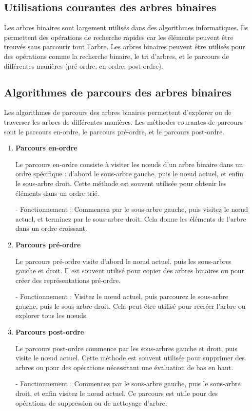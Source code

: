 \subsection{Utilisations courantes des arbres binaires}
Les arbres binaires sont largement utilisés dans des algorithmes informatiques. Ils permettent des opérations de recherche rapides car les éléments peuvent être trouvés sans parcourir tout l'arbre. Les arbres binaires peuvent être utilisés pour des opérations comme la recherche binaire, le tri d'arbres, et le parcours de différentes manières (pré-ordre, en-ordre, post-ordre).

\subsection{Algorithmes de parcours des arbres binaires}

Les algorithmes de parcours des arbres binaires permettent d'explorer ou de traverser les arbres de différentes manières. Les méthodes courantes de parcours sont le parcours en-ordre, le parcours pré-ordre, et le parcours post-ordre.

\begin{enumerate}[label=\alph*)]
	\item \textbf{Parcours en-ordre}
	
	Le parcours en-ordre consiste à visiter les nœuds d'un arbre binaire dans un ordre spécifique : d'abord le sous-arbre gauche, puis le nœud actuel, et enfin le sous-arbre droit. Cette méthode est souvent utilisée pour obtenir les éléments dans un ordre trié.
	
	- Fonctionnement : Commencez par le sous-arbre gauche, puis visitez le nœud actuel, et terminez par le sous-arbre droit. Cela donne les éléments de l'arbre dans un ordre croissant.
	
	\item \textbf{Parcours pré-ordre}
	
	Le parcours pré-ordre visite d'abord le nœud actuel, puis les sous-arbres gauche et droit. Il est souvent utilisé pour copier des arbres binaires ou pour créer des représentations pré-ordre.
	
	- Fonctionnement : Visitez le nœud actuel, puis parcourez le sous-arbre gauche, puis le sous-arbre droit. Cela peut être utilisé pour recréer l'arbre ou explorer tous les nœuds.
	
	\item \textbf{Parcours post-ordre}
	
	Le parcours post-ordre commence par les sous-arbres gauche et droit, puis visite le nœud actuel. Cette méthode est souvent utilisée pour supprimer des arbres ou pour des opérations nécessitant une évaluation de bas en haut.
	
	- Fonctionnement : Commencez par le sous-arbre gauche, puis le sous-arbre droit, et enfin visitez le nœud actuel. Ce parcours est utile pour des opérations de suppression ou de nettoyage d'arbre.
	
\end{enumerate}

